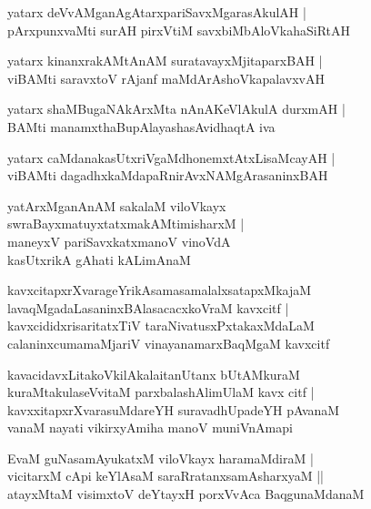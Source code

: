 \documentclass[twoside,12pt,openright]{book}
\newcounter{shloka}[chapter]
\begin{document}
\begin{shloka}%
yatarx deVvAMganAgAtarxpariSavxMgarasAkulAH |\\
pArxpunxvaMti surAH pirxVtiM savxbiMbAloVkahaSiRtAH 
\end{shloka}

\begin{shloka}%
yatarx kinanxrakAMtAnAM suratavayxMjitaparxBAH |\\
viBAMti saravxtoV rAjanf maMdArAshoVkapalavxvAH 
\end{shloka}

\begin{shloka}%
yatarx shaMBugaNAkArxMta nAnAKeVlAkulA durxmAH |\\
BAMti manamxthaBupAlayashasAvidhaqtA iva 
\end{shloka}

\begin{shloka}%
yatarx caMdanakasUtxriVgaMdhonemxtAtxLisaMcayAH |\\
viBAMti dagadhxkaMdapaRnirAvxNAMgArasaninxBAH 
\end{shloka}

\begin{shloka}%
yatArxMganAnAM sakalaM viloVkayx \\
swraBayxmatuyxtatxmakAMtimisharxM |\\
maneyxV pariSavxkatxmanoV vinoVdA \\
kasUtxrikA gAhati kALimAnaM 
\end{shloka}

\begin{shloka}%
kavxcitapxrXvarageYrikAsamasamalalxsatapxMkajaM \\
lavaqMgadaLasaninxBAlasacacxkoVraM kavxcitf |\\
kavxcididxrisaritatxTiV taraNivatusxPxtakaxMdaLaM \\
calaninxcumamaMjariV vinayanamarxBaqMgaM kavxcitf 
\end{shloka}

\begin{shloka}%
kavacidavxLitakoVkilAkalaitanUtanx bUtAMkuraM \\
kuraMtakulaseVvitaM parxbalashAlimUlaM kavx citf |\\
kavxxitapxrXvarasuMdareYH suravadhUpadeYH pAvanaM \\
vanaM nayati vikirxyAmiha manoV muniVnAmapi 
\end{shloka}

\begin{shloka}%
EvaM guNasamAyukatxM viloVkayx haramaMdiraM |\\
vicitarxM cApi keYlAsaM saraRratanxsamAsharxyaM ||\\
atayxMtaM visimxtoV deYtayxH porxVvAca BaqgunaMdanaM 
\end{shloka}
\end{document}
